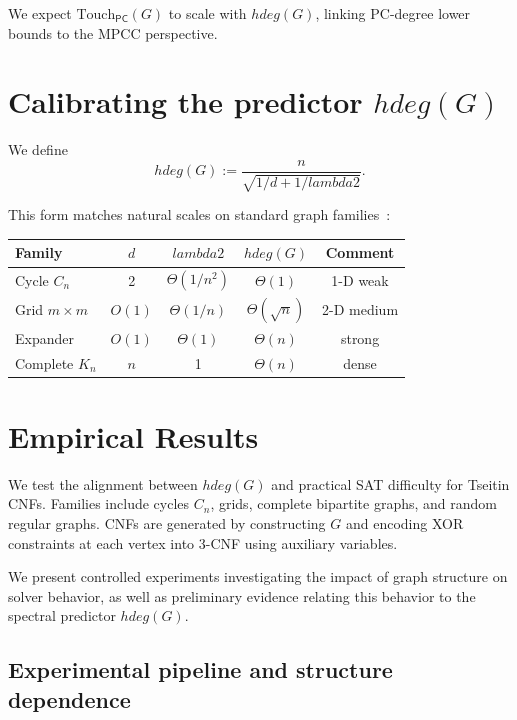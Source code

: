 \documentclass[11pt,a4paper]{article}
\def\gap{lambda2}%
\def\hdeg{hdeg}%
\theoremstyle{remark}
\newcommand{\gap}{\lambda_2}
\newcommand{\hdeg}{\widehat{\deg}}
\begin{document}
We expect $\mathrm{Touch}_{\mathsf{PC}}(G)$ to scale with $\hdeg(G)$, linking
PC-degree lower bounds to the MPCC perspective.

\section{Calibrating the predictor $\hdeg(G)$}

We define
\[
\hdeg(G) := \frac{n}{\sqrt{1/d + 1/\gap}}.
\]

This form matches natural scales on standard graph families~\cite{Chung1997,HooryLinialWigderson}:

\begin{center}
\renewcommand{\arraystretch}{1.05}\small
\begin{tabular}{lcccc}
\toprule
Family          & $d$   & $\gap$           & $\hdeg(G)$        & Comment        \\
\midrule
Cycle $C_n$     & 2     & $\Theta(1/n^2)$ & $\Theta(1)$       & 1-D weak       \\
Grid $m\times m$& $O(1)$& $\Theta(1/n)$   & $\Theta(\sqrt{n})$& 2-D medium     \\
Expander        & $O(1)$& $\Theta(1)$     & $\Theta(n)$       & strong         \\
Complete $K_n$  & $n$   & 1               & $\Theta(n)$       & dense          \\
\bottomrule
\end{tabular}
\end{center}

\section{Empirical Results}

We test the alignment between $\hdeg(G)$ and practical SAT difficulty for Tseitin CNFs.
Families include cycles $C_n$, grids, complete bipartite graphs, and random regular graphs.
CNFs are generated by constructing $G$ and encoding XOR constraints at each vertex into
3-CNF using auxiliary variables.

We present controlled experiments investigating the impact of graph structure
on solver behavior, as well as preliminary evidence relating this behavior
to the spectral predictor $\hdeg(G)$.

\subsection{Experimental pipeline and structure dependence}
\end{document}
